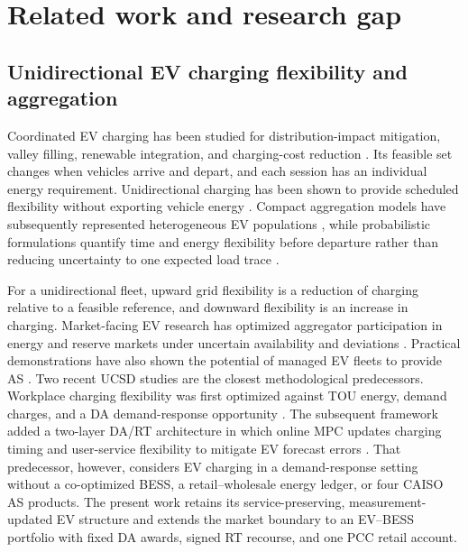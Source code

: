 \documentclass[final,5p,times]{elsarticle}
\begin{document}
\section{Related work and research gap}
\label{sec:literature}
\label{sec:related_work}

\subsection{Unidirectional EV charging flexibility and aggregation}
Coordinated EV charging has been studied for distribution-impact mitigation, valley filling, renewable integration, and charging-cost reduction \cite{clement2010impact} \cite{sortomme2011optimal} \cite{gan2013optimal} \cite{richardson2013electric}. Its feasible set changes when vehicles arrive and depart, and each session has an individual energy requirement. Unidirectional charging has been shown to provide scheduled flexibility without exporting vehicle energy \cite{sortomme2011optimal}. Compact aggregation models have subsequently represented heterogeneous EV populations \cite{zheng2013aggregation} \cite{nazari2022updated} \cite{alTaha2025aggregateFlex}, while probabilistic formulations quantify time and energy flexibility before departure rather than reducing uncertainty to one expected load trace \cite{huber2020probabilistic}.

For a unidirectional fleet, upward grid flexibility is a reduction of charging relative to a feasible reference, and downward flexibility is an increase in charging. Market-facing EV research has optimized aggregator participation in energy and reserve markets under uncertain availability and deviations \cite{vagropoulos2013optimal} \cite{bessa2014optimization}. Practical demonstrations have also shown the potential of managed EV fleets to provide AS \cite{deforest2018lafb}. Two recent UCSD studies are the closest methodological predecessors. Workplace charging flexibility was first optimized against TOU energy, demand charges, and a DA demand-response opportunity \cite{chen2024costoptimal}. The subsequent framework added a two-layer DA/RT architecture in which online MPC updates charging timing and user-service flexibility to mitigate EV forecast errors \cite{chen2026realtime}. That predecessor, however, considers EV charging in a demand-response setting without a co-optimized BESS, a retail--wholesale energy ledger, or four CAISO AS products. The present work retains its service-preserving, measurement-updated EV structure and extends the market boundary to an EV--BESS portfolio with fixed DA awards, signed RT recourse, and one PCC retail account.
\end{document}
